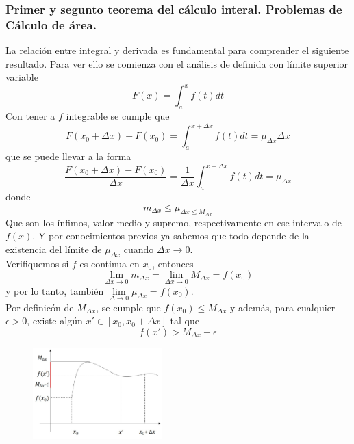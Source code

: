 \documentclass[10pt,twoside]{SelfArx} %
\begin{document}
 \subsubsection{Primer y segunto teorema del cálculo interal. Problemas de Cálculo de área.}
La relación entre integral y derivada es fundamental para comprender el siguiente resultado. Para ver ello se comienza con el análisis de definida con límite superior variable
\[ F(x)=\int_{a}^{x}f(t)dt \]
Con tener a $ f $ integrable se cumple que 
\begin{equation}
\displaystyle F(x_{0}+\Delta x)-F(x_{0})=\int_{a}^{x+\Delta x}f(t)dt=\mu_{\Delta x}\Delta x
\end{equation}
que se puede llevar a la forma
\begin{equation}
\displaystyle \dfrac{F(x_{0}+\Delta x)-F(x_{0})}{\Delta x}=\dfrac{1}{\Delta x}\int_{a}^{x+\Delta x}f(t)dt=\mu_{\Delta x}
\end{equation}
donde 
\[ m_{\Delta x}\leq \mu_{\Delta x\leq M_{\Delta x}} \]
Que son los ínfimos, valor medio y supremo, respectivamente en ese intervalo de $ f(x) $. Y por conocimientos previos ya sabemos que todo depende de la existencia del límite de $ \mu_{\Delta x} $ cuando $ \Delta x\rightarrow0 $. \\
Verifiquemos si $ f $ es continua en $ x_{0} $, entonces
\[ \lim\limits_{\Delta x\rightarrow0}m_{\Delta x}=\lim\limits_{\Delta x\rightarrow0}M_{\Delta x}=f(x_{0}) \]
y por lo tanto, también $ \lim\limits_{\Delta \rightarrow0}\mu_{\Delta x}=f(x_{0}) $.
\\Por definicón  de $ M_{\Delta x} $, se cumple que $ f(x_{0})\leq M_{\Delta x} $ y además, para cualquier $ \epsilon>0 $, existe algún $ x'\in[x_{0},x_{0}+\Delta x] $ tal que 
\[ f(x')>M_{\Delta x}-\epsilon \]


 \begin{figure}[h]
 	\centering
 	\includegraphics[width=5cm]{integracion7}
 	\caption{}
 	\label{integracion7}
 \end{figure}
\end{document}

